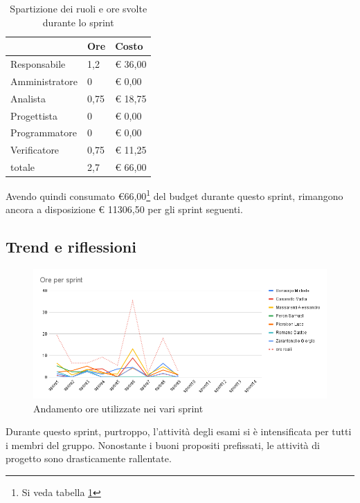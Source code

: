 \begin{table}[ht]
    \begin{tabularx}{\linewidth}{X|l|l}
    \rowcolor{gray!30}& Ore & Costo \\
    \hline
    
    Responsabile & 1,2 & € 36,00 \\
    \rowcolor{gray!10}Amministratore & 0 & € 0,00 \\
    Analista & 0,75 & € 18,75 \\
    \rowcolor{gray!10}Progettista & 0 & € 0,00 \\
    Programmatore & 0 & € 0,00 \\
    \rowcolor{gray!10}Verificatore & 0,75 &€ 11,25 \\
    totale & 2,7 & € 66,00 \\
    \end{tabularx}
    \caption{\label{costi-ruolo}Spartizione dei ruoli e ore svolte durante lo sprint}
\end{table}

Avendo quindi consumato €66,00\footnote{Si veda tabella \ref{costi-ruolo}} del budget durante questo sprint, rimangono ancora a disposizione € 11306,50 per gli sprint seguenti.

\subsection{Trend e riflessioni}\label{subsec:trend}

\begin{figure}[H]
    \includegraphics[width=\linewidth]{img/andamento.png}
    \caption{Andamento ore utilizzate nei vari sprint}\label{img:andamento}
\end{figure}

Durante questo sprint, purtroppo, l'attività degli esami si è intensificata per tutti i membri del gruppo. Nonostante i buoni propositi prefissati, le attività di progetto sono drasticamente rallentate.

